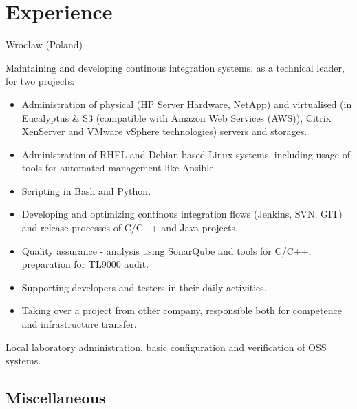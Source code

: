 \documentclass[11pt,a4paper,sans]{moderncv}
\begin{document}
\makecvtitle
\section{Experience}
%
    {Wrocław (Poland)}{}{Maintaining and developing continous integration systems, as a technical leader, for two projects:
\begin{itemize}
    \item Administration of physical (HP Server Hardware, NetApp) and virtualised (in Eucalyptus \& S3 (compatible with Amazon Web Services (AWS)), %
        Citrix XenServer and VMware vSphere technologies) servers and storages.
    \item Administration of RHEL and Debian based Linux systems, including usage of tools for automated management like Ansible.
    \item Scripting in Bash and Python.
    \item Developing and optimizing continous integration flows (Jenkins, SVN, GIT) and release processes of C/C++ and Java projects.
    \item Quality assurance - analysis using SonarQube and tools for C/C++, preparation for TL9000 audit.
    \item Supporting developers and testers in their daily activities.
    \item Taking over a project from other company, responsible both for competence and infrastructure transfer.
\end{itemize}
}
%
    {Local laboratory administration, basic configuration and verification of OSS systems.}
\subsection{Miscellaneous}
\end{document}
